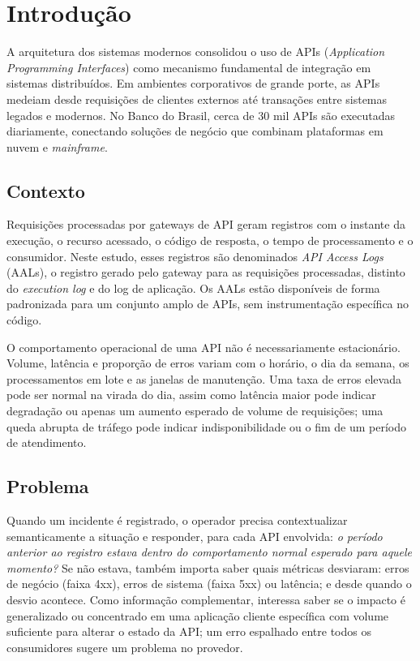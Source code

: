 \documentclass[sigconf,nonacm]{acmart}
\begin{document}
\section{Introdução}

A arquitetura dos sistemas modernos consolidou o uso de APIs (\emph{Application Programming Interfaces}) como mecanismo fundamental de integração em sistemas distribuídos. Em ambientes corporativos de grande porte, as APIs medeiam desde requisições de clientes externos até transações entre sistemas legados e modernos. No Banco do Brasil, cerca de 30 mil APIs são executadas diariamente, conectando soluções de negócio que combinam plataformas em nuvem e \emph{mainframe}.

\subsection{Contexto}

Requisições processadas por gateways de API geram registros com o instante da execução, o recurso acessado, o código de resposta, o tempo de processamento e o consumidor. Neste estudo, esses registros são denominados \emph{API Access Logs} (AALs), o registro gerado pelo gateway para as requisições processadas, distinto do \emph{execution log} e do log de aplicação. Os AALs estão disponíveis de forma padronizada para um conjunto amplo de APIs, sem instrumentação específica no código.

O comportamento operacional de uma API não é necessariamente estacionário. Volume, latência e proporção de erros variam com o horário, o dia da semana, os processamentos em lote e as janelas de manutenção. Uma taxa de erros elevada pode ser normal na virada do dia, assim como latência maior pode indicar degradação ou apenas um aumento esperado de volume de requisições; uma queda abrupta de tráfego pode indicar indisponibilidade ou o fim de um período de atendimento.

\subsection{Problema}
Quando um incidente é registrado, o operador precisa contextualizar semanticamente a situação e responder, para cada API envolvida: \emph{o período anterior ao registro estava dentro do comportamento normal esperado para aquele momento?} Se não estava, também importa saber quais métricas desviaram: erros de negócio (faixa 4xx), erros de sistema (faixa 5xx) ou latência; e desde quando o desvio acontece. Como informação complementar, interessa saber se o impacto é generalizado ou concentrado em uma aplicação cliente específica com volume suficiente para alterar o estado da API; um erro espalhado entre todos os consumidores sugere um problema no provedor.
\end{document}
